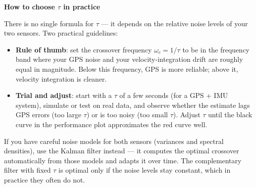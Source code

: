 \documentclass[12pt, a4paper]{article}
\begin{document}
\begin{notebox}
  \textbf{How to choose $\tau$ in practice}

  There is no single formula for $\tau$ --- it depends on the relative
  noise levels of your two sensors.
  Two practical guidelines:

  \begin{itemize}[leftmargin=1.2em, itemsep=3pt]
    \item \textbf{Rule of thumb}: set the crossover frequency
      $\omega_c = 1/\tau$ to be in the frequency band where your GPS
      noise and your velocity-integration drift are roughly equal in
      magnitude.
      Below this frequency, GPS is more reliable; above it, velocity
      integration is cleaner.

    \item \textbf{Trial and adjust}: start with a $\tau$ of a few seconds
      (for a GPS + IMU system), simulate or test on real data, and observe
      whether the estimate lags GPS errors (too large $\tau$) or is too
      noisy (too small $\tau$).
      Adjust $\tau$ until the black curve in the performance plot
      approximates the red curve well.
  \end{itemize}

  If you have careful noise models for both sensors (variances and spectral
  densities), use the Kalman filter instead --- it computes the optimal
  crossover automatically from those models and adapts it over time.
  The complementary filter with fixed $\tau$ is optimal only if the noise
  levels stay constant, which in practice they often do not.
\end{notebox}
\end{document}
